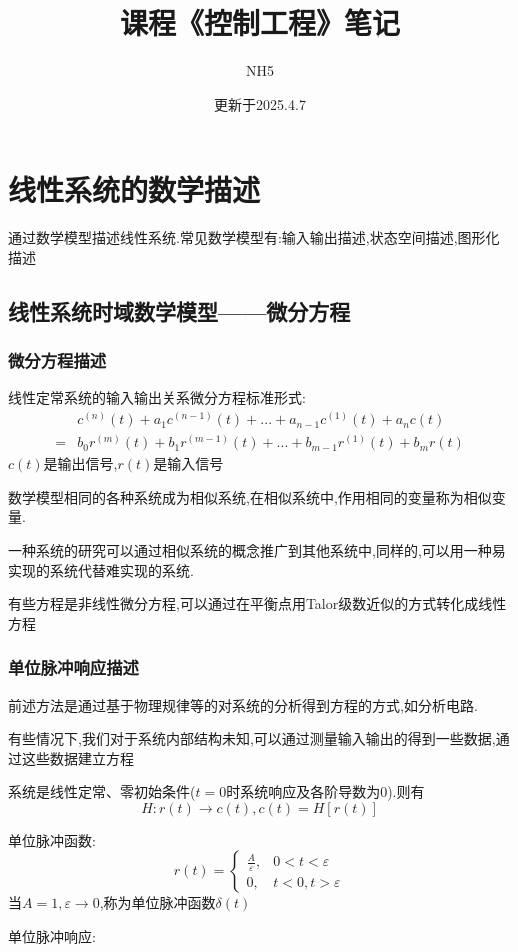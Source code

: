 \documentclass[12pt,a4paper,oneside]{ctexart}
\title{课程《控制工程》笔记}
\author{NH5}
\date{更新于2025.4.7}
\begin{document}
\maketitle
\section{线性系统的数学描述}
通过数学模型描述线性系统.常见数学模型有:输入输出描述,状态空间描述,图形化描述

\subsection{线性系统时域数学模型——微分方程}
\subsubsection{微分方程描述}
线性定常系统的输入输出关系微分方程标准形式:
\begin{align*}
    &c^{(n)}(t) + a_1c^{(n-1)}(t) + ... + a_{n-1}c^{(1)}(t) + a_nc(t)\\
    = &b_0r^{(m)}(t) + b_1r^{(m-1)}(t) + ... + b_{m-1}r^{(1)}(t) + b_mr(t)
\end{align*}
$c(t)$是输出信号,$r(t)$是输入信号

数学模型相同的各种系统成为相似系统,在相似系统中,作用相同的变量称为相似变量.

一种系统的研究可以通过相似系统的概念推广到其他系统中,同样的,可以用一种易实现的系统代替难实现的系统.

有些方程是非线性微分方程,可以通过在平衡点用Talor级数近似的方式转化成线性方程

\subsubsection{单位脉冲响应描述}
前述方法是通过基于物理规律等的对系统的分析得到方程的方式,如分析电路.

有些情况下,我们对于系统内部结构未知,可以通过测量输入输出的得到一些数据,通过这些数据建立方程

系统是线性定常、零初始条件($t=0$时系统响应及各阶导数为$0$).则有
\[
    H:r(t) \to c(t),c(t) = H[r(t)]
\]

单位脉冲函数:
\[
    r(t)=\begin{cases}
        \frac{A}{\varepsilon}, &0<t<\varepsilon \\
        0, & t<0,t>\varepsilon
    \end{cases}
\]
当$A=1,\varepsilon \to 0$,称为单位脉冲函数$\delta(t)$

单位脉冲响应:
\end{document}
